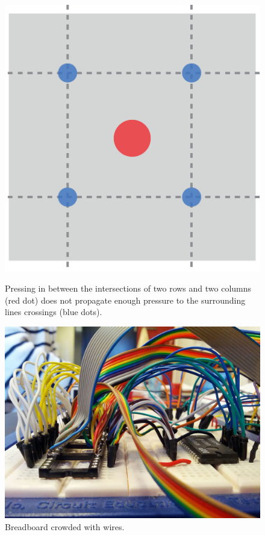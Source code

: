 \begin{figure}
\centering
\begin{minipage}[t]{.44\textwidth}
  \centering
  \includegraphics[width=\linewidth]{figures/touch/intersections}
  \caption[Pressing in between the intersection of two rows and two columns does not propagate enough pressure.]
  {Pressing in between the intersections of two rows and two columns (red dot) does not propagate enough pressure to the surrounding lines crossings (blue dots).}
  \label{fig:textiletouch:intersections}
\end{minipage}%
\hspace{0.02\textwidth}
\begin{minipage}[t]{.44\textwidth}
  \centering
  \includegraphics[width=\linewidth]{figures/touch/wires}
  \caption[Breadboard crowded with wires.]
  {Breadboard crowded with wires.}
  \label{fig:textiletouch:wires}
\end{minipage}
\end{figure}

